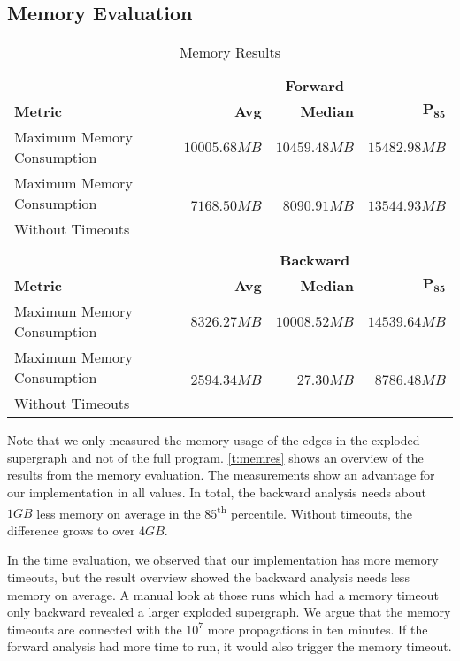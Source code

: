 \documentclass[../draft.tex]{subfiles}
\begin{document}
    \FloatBarrier
    \subsection{Memory Evaluation}\label{s:memex}

    \begin{table}[ht]
        \centering
        \begin{tabular}{l | r | r | r}
            & \multicolumn{3}{c}{\textbf{Forward}}\\
            \textbf{Metric} & \textbf{Avg} & \textbf{Median} & $\mathbf{P_{85}}$\\
            \hline\hline
            Maximum Memory Consumption & $10005.68MB$ & $10459.48MB$ & $15482.98MB$\\
            \hline
            Maximum Memory Consumption & \multirow{2}{*}{$7168.50MB$} & \multirow{2}{*}{$8090.91MB$} & \multirow{2}{*}{$13544.93MB$}\\
            Without Timeouts & & &\\
            \multicolumn{4}{c}{}\\
            & \multicolumn{3}{c}{\textbf{Backward}}\\
            \textbf{Metric} & \textbf{Avg} & \textbf{Median} & $\mathbf{P_{85}}$\\
            \hline\hline
            Maximum Memory Consumption & $8326.27MB$ & $10008.52MB$ & $14539.64MB$\\
            \hline
            Maximum Memory Consumption & \multirow{2}{*}{$2594.34MB$} & \multirow{2}{*}{$27.30MB$} & \multirow{2}{*}{$8786.48MB$}\\
            Without Timeouts & & &\\
        \end{tabular}
        \caption{Memory Results}
        \label{t:memres}
    \end{table}

    Note that we only measured the memory usage of the edges in the exploded supergraph and not of the full program. 
    \autoref{t:memres} shows an overview of the results from the memory evaluation.  
    The measurements show an advantage for our implementation in all values. In total, the backward analysis needs about $1GB$ less memory on average in the 85\textsuperscript{th} percentile. Without timeouts, the difference grows to over $4GB$.
    
    In the time evaluation, we observed that our implementation has more memory timeouts, but the result overview showed the backward analysis needs less memory on average.
    A manual look at those runs which had a memory timeout only backward revealed a larger exploded supergraph. 
    We argue that the memory timeouts are connected with the $10^7$ more propagations in ten minutes. If the forward analysis had more time to run, it would also trigger the memory timeout.
       
\end{document}
